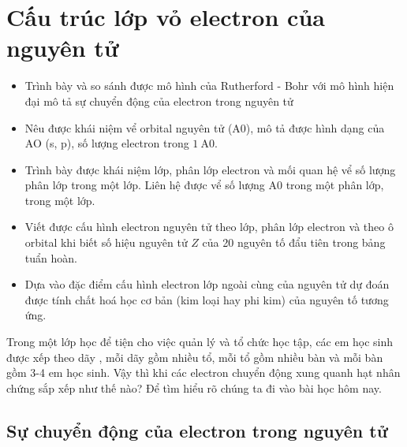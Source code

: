 \newpage
\section{Cấu trúc lớp vỏ electron của nguyên tử}
\begin{mtbh}
	\begin{itemize}
		\item Trình bày và so sánh được mô hình của Rutherford - Bohr với mô hình hiện đại mô tả sự chuyển động của electron trong nguyên tử
		\item Nêu được khái niệm vể orbital nguyên tử (A0), mô tả được hình dạng của AO (s, p), số lượng electron trong $1 \mathrm{~A} 0$.
		\item Trình bày được khái niệm lớp, phân lớp electron và mối quan hệ vể số lượng phân lớp trong một lớp. Liên hệ được vể số lượng A0 trong một phân lớp, trong một lớp.
		\item Viết được cấu hình electron nguyên tử theo lớp, phân lớp electron và theo ô orbital khi biết số hiệu nguyên tử $Z$ của 20 nguyên tố đẩu tiên trong bảng tuẩn hoàn.
		\item Dựa vào đặc điểm cấu hình electron lớp ngoài cùng của nguyên tử dự đoán được tính chất hoá học cơ bản (kim loại hay phi kim) của nguyên tố tương ứng. 
	\end{itemize}
\end{mtbh}

\begin{kd}
	Trong một lớp học để tiện cho việc quản lý và tổ chức học tập, các em học sinh được xếp theo dãy , mỗi dãy gồm nhiều tổ, mỗi tổ gồm nhiều bàn và mỗi bàn gồm 3-4 em học sinh. Vậy thì khi các electron chuyển động xung quanh hạt nhân chứng sắp xếp như thế nào? Để tìm hiểu rõ chúng ta đi vào bài học hôm nay.
\end{kd}
\newpage
\subsection{Sự chuyển động của electron trong nguyên tử}
